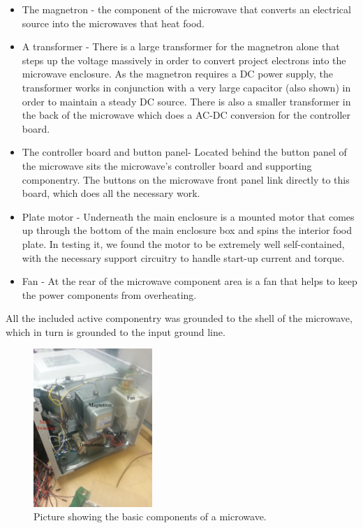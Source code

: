 \documentclass[10pt,journal,letterpaper,twocolumn]{IEEEtran}
\begin{document}
\begin{itemize}
    \item The magnetron - the component of the microwave that converts an electrical source into the microwaves that heat food.
    \item A transformer - There is a large transformer for the magnetron alone that steps up the voltage massively in order to convert project electrons into the microwave enclosure.  As the magnetron requires a DC power supply, the transformer works in conjunction with a very large capacitor (also shown) in order to maintain a steady DC source.  There is also a smaller transformer in the back of the microwave which does a AC-DC conversion for the controller board.
    \item The controller board and button panel- Located behind the button panel of the microwave sits the microwave's controller board and supporting componentry.  The buttons on the microwave front panel link directly to this board, which does all the necessary work.
    \item Plate motor - Underneath the main enclosure is a mounted motor that comes up through the bottom of the main enclosure box and spins the interior food plate.  In testing it, we found the motor to be extremely well self-contained, with the necessary support circuitry to handle start-up current and torque.
    \item Fan - At the rear of the microwave component area is a fan that helps to keep the power components from overheating.
\end{itemize}

All the included active componentry was grounded to the shell of the microwave, which in turn is grounded to the input ground line.

\begin{figure}[ht]
\centering
\includegraphics[width=0.4\textwidth]{Microwave_Innards.jpeg}
\caption{\label{fig:innards}Picture showing the basic components of a microwave.}
\end{figure}
\end{document}
